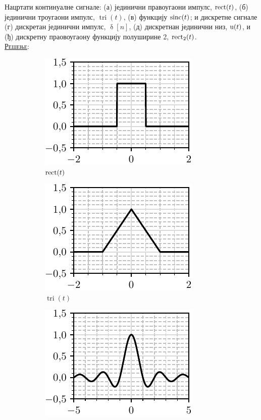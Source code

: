 \PID Нацртати континуалне сигнале:
(а) јединични правоугаони импулс, $\operatorname{rect}(t)$, 
(б) јединични троугаони импулс, $\operatorname{tri}(t)$, 
(в) функцију $\operatorname{sinc}(t)$; и дискретне сигнале 
(г) дискретан јединични импулс, $\updelta[n]$, 
(д) дискретнан јединични низ, ${\rm u}(t)$, и 
(ђ) дискретну праовоугаону функцију полуширине 2, $\operatorname{rect}_2(t)$.
\\[2mm]

\textsc{\underline{Решење}}:
\begin{figure}[ht!]
    \hspace*{0pt}\hfill
    \begin{subfigure}[c]{0.33\textwidth}
        \centering
        \includegraphics[scale=1]{fig/rect_plot.pdf}
        \caption{$\operatorname{rect}(t)$}
    \end{subfigure}
    \hspace*{0pt}\hfill
    \begin{subfigure}[c]{0.3\textwidth}
        \centering
        \includegraphics[scale=1]{fig/tri_plot.pdf}
        \caption{$\operatorname{tri}(t)$}
    \end{subfigure}
    \hfill
    \hspace*{0pt}
    \hspace*{0pt}\hfill
    \begin{subfigure}[c]{0.3\textwidth}
        \centering
        \includegraphics[scale=1]{fig/sinc_plot.pdf}

\end{subfigure}
\end{figure}
